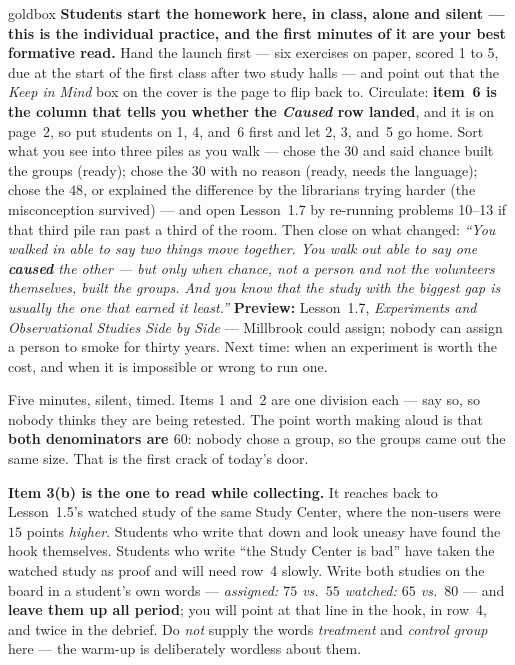 \documentclass[10pt]{article}
\begin{document}
\boxguard
\begin{skillbox}{goldbox}
\textbf{Students start the homework here, in class, alone and silent --- this is the individual
practice, and the first minutes of it are your best formative read.} Hand the launch first ---
six exercises on paper, scored 1 to 5, due at the start of the first class after two study
halls --- and point out that the \emph{Keep in Mind} box on the cover is the page to flip back
to. Circulate: \textbf{item~6 is the column that tells you whether the \emph{Caused} row
landed}, and it is on page~2, so put students on 1, 4, and~6 first and let 2, 3, and~5 go home.
Sort what you see into three piles as you walk --- chose the $30$ and said chance built the
groups (ready); chose the $30$ with no reason (ready, needs the language); chose the $48$, or
explained the difference by the librarians trying harder (the misconception survived) --- and
open Lesson~1.7 by re-running problems 10--13 if that third pile ran past a third of the room.
Then close on what changed: \emph{``You walked in able to say two things move together. You
walk out able to say one \textbf{caused} the other --- but only when chance, not a person and
not the volunteers themselves, built the groups. And you know that the study with the biggest
gap is usually the one that earned it least.''} \textbf{Preview:} Lesson~1.7, \emph{Experiments
and Observational Studies Side by Side} --- Millbrook could assign; nobody can assign a person
to smoke for thirty years. Next time: when an experiment is worth the cost, and when it is
impossible or wrong to run one.
\end{skillbox}

\begin{teachernote}[Warm-Up]
Five minutes, silent, timed. Items 1 and~2 are one division each --- say so, so nobody thinks
they are being retested. The point worth making aloud is that \textbf{both denominators are
$60$}: nobody chose a group, so the groups came out the same size. That is the first crack of
today's door.

\textbf{Item 3(b) is the one to read while collecting.} It reaches back to Lesson~1.5's
watched study of the same Study Center, where the non-users were $15$ points \emph{higher}.
Students who write that down and look uneasy have found the hook themselves. Students who
write ``the Study Center is bad'' have taken the watched study as proof and will need row~4
slowly. Write both studies on the board in a student's own words ---
\emph{assigned: $75$ vs.\ $55$ \quad watched: $65$ vs.\ $80$} --- and \textbf{leave them up all
period}; you will point at that line in the hook, in row~4, and twice in the debrief. Do
\emph{not} supply the words \emph{treatment} and \emph{control group} here --- the warm-up is
deliberately wordless about them.
\end{teachernote}
\end{document}
